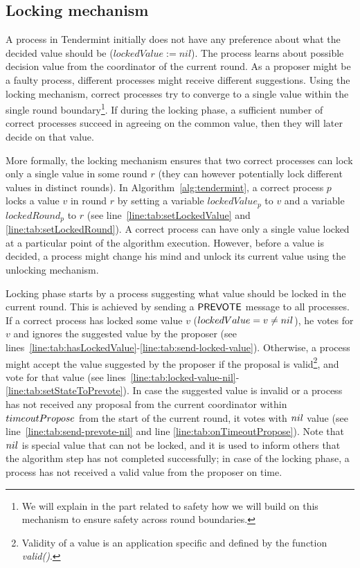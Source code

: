 \subsection{Locking mechanism}
\label{sec:locking}

A process in Tendermint initially does not have any preference about what the decided value should be ($lockedValue := nil$). The process learns about possible decision value from the coordinator of the current round. As a proposer might be a faulty process, different processes
might receive different suggestions. Using the locking mechanism, correct processes try to converge to a single value within the single round boundary\footnote{We will explain in the part related to safety how we will build on this mechanism to ensure safety across round boundaries.}.
If during the locking phase, a sufficient number of correct processes succeed in agreeing on the common value, then they will later decide on that value. 

More formally, the locking mechanism ensures that two correct processes can lock only a single value in some round $r$ (they can however potentially lock different values in distinct rounds). In Algorithm~\ref{alg:tendermint}, a correct process $p$ locks a value $v$ in round $r$ by setting a variable $lockedValue_p$ to $v$ and a variable $lockedRound_p$ to $r$ (see line~\ref{line:tab:setLockedValue} and \ref{line:tab:setLockedRound}). A correct process can have only a single value locked at a particular point of the algorithm execution. 
However, before a value is decided, a process might change his mind and unlock its current value using the unlocking mechanism. 

Locking phase starts by a process suggesting what value should be locked in the current round. This is achieved by sending a $\mathsf{PREVOTE}$ message to all processes. If a correct process has locked some value $v$ ($lockedValue = v \neq nil$), he votes for $v$ and ignores the suggested value by the proposer (see lines~\ref{line:tab:hasLockedValue}-\ref{line:tab:send-locked-value}). Otherwise, a process might accept the value suggested by the proposer if the proposal is valid\footnote{Validity of a value is an application specific and defined by the function \emph{valid()}.}, and vote for that value (see lines~\ref{line:tab:locked-value-nil}-\ref{line:tab:setStateToPrevote}). In case the suggested value is invalid or a process has not received any proposal from the current coordinator within $timeoutPropose$ from the start of the current round, it votes with $nil$ value (see line~\ref{line:tab:send-prevote-nil} and line \ref{line:tab:onTimeoutPropose}). Note that $nil$ is special value that can not be locked, and it is used to inform others that the algorithm step has not completed successfully; in case of the locking phase, a process has not received a valid value from the proposer on time. 

